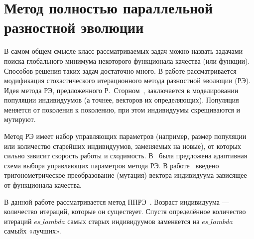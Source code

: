 \chapter{Метод полностью параллельной разностной эволюции} \label{chapt1}

В самом общем смысле класс рассматриваемых задач можно назвать задачами 
поиска глобального минимума некоторого функционала качества (или функции). 
Способов решения таких задач достаточно много. В работе рассматривается 
модификация стохастического итерационного метода разностной эволюции (РЭ). 
Идея метода РЭ, предложенного Р.~Сторном~\cite{bib1}, заключается в 
моделировании популяции индивидуумов (а точнее, векторов их определяющих). 
Популяция меняется от поколения к поколению, при этом индивидуумы скрещиваются 
и мутируют. 

Метод РЭ имеет набор управляющих параметров (например, размер популяции 
или количество старейших индивидуумов, заменяемых на новые), от которых сильно 
зависит скорость работы и сходимость. В~\cite{bibZaharie} была предложена 
адаптивная схема выбора управляющих параметров метода РЭ. В работе~\cite{bibTM}
введено тригонометрическое преобразование (мутация) вектора-индивидуума 
зависящее от функционала качества. 

В данной работе рассматривается метод ППРЭ~\cite{bib2,bib5}. 
Возраст индивидуума — количество итераций, которые он существует. 
Спустя определённое количество итераций $es\_lambda$ самых старых
индивидуумов заменяется на $es\_lambda$ самыйх «лучших».


